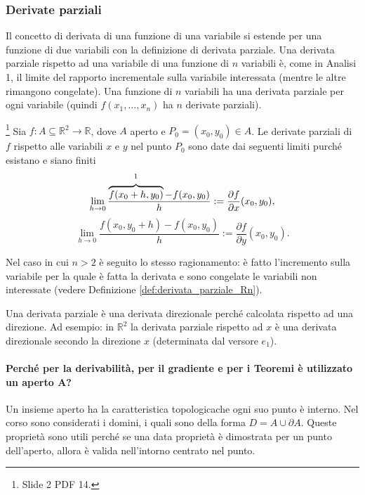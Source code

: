 \subsubsection{Derivate parziali}
Il concetto di derivata di una funzione di una variabile si estende per una funzione di due variabili con la definizione di derivata parziale. Una derivata parziale rispetto ad una variabile di una funzione di $n$ variabili è, come in Analisi 1, il limite del rapporto incrementale sulla variabile interessata (mentre le altre rimangono congelate). Una funzione di $n$ variabili ha una derivata parziale per ogni variabile (quindi $f(x_1,\hdots,x_n)$ ha $n$ derivate parziali).

\begin{definition}[Derivate parziali (caso $n=2$)]\footnote{Slide 2 PDF 14.}
    Sia $f:A\subseteq\mathbb R^2\rightarrow\mathbb R$, dove $A$ aperto e $P_0=(x_0,y_0)\in A$. Le derivate parziali di $f$ rispetto alle variabili $x$ e $y$ nel punto $P_0$ sono date dai seguenti limiti purché esistano e siano finiti
    \begin{equation}\label{eq:derivata_parziale_x}
        \lim_{h\rightarrow 0}\frac{\overbrace{f(x_0+h, y_0)}^{\footnotemark}-f(x_0, y_0)}{h}:=\frac{\partial f}{\partial x}(x_0,y_0),
    \end{equation}
    \begin{equation}\label{eq:derivata_parziale_y}
        \lim_{h\rightarrow 0}\frac{f(x_0, y_0+h)-f(x_0, y_0)}{h}:=\frac{\partial f}{\partial y}(x_0,y_0).
    \end{equation}
\end{definition}

Nel caso in cui $n>2$ è seguito lo stesso ragionamento: è fatto l'incremento sulla variabile per la quale è fatta la derivata e sono congelate le variabili non interessate (vedere Definizione \ref{def:derivata_parziale_Rn}).

Una derivata parziale è una derivata direzionale perché calcolata rispetto ad una direzione. Ad esempio: in $\mathbb R^2$ la derivata parziale rispetto ad $x$ è una derivata direzionale secondo la direzione $x$ (determinata dal versore $e_1$).

\paragraph{Perché per la derivabilità, per il gradiente e per i Teoremi è utilizzato un aperto $\boldsymbol{A}$?} Un insieme aperto ha la caratteristica topologicache ogni suo punto è interno. Nel corso sono considerati i domini, i quali sono della forma $D= A\cup\partial A$. Queste proprietà sono utili perché se una data proprietà è dimostrata per un punto dell'aperto, allora è valida nell'intorno centrato nel punto.

